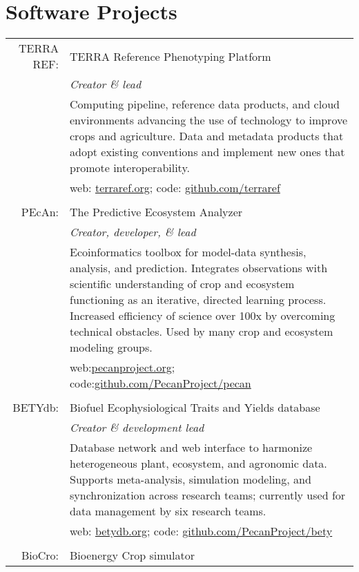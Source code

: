 \documentclass[a4paper,10pt]{article}
\begin{document}
\section{Software Projects}

\begin{tabular}{rp{11cm}}
TERRA REF:&TERRA Reference Phenotyping Platform\\
& \small \textit{Creator \& lead}\\
& \small Computing pipeline, reference data products, and cloud environments advancing the use of technology to improve crops and agriculture. Data and metadata products that adopt existing conventions and implement new ones that promote interoperability.\\
& \small web: \href{http://www.terraref.org}{terraref.org}; code:  \href{https://github.com/terraref}{github.com/terraref}\\
\multicolumn{2}{c}{} \\
PEcAn:&The Predictive Ecosystem Analyzer\\
& \small \textit{Creator, developer, \& lead}\\
& \small Ecoinformatics toolbox for model-data synthesis, analysis, and prediction. Integrates observations with scientific understanding of crop and ecosystem functioning as an iterative, directed learning process. Increased efficiency of science over 100x by overcoming technical obstacles. Used by many crop and ecosystem modeling groups.\\
& \small web:\href{http://www.pecanproject.org}{pecanproject.org};  code:\href{https://github.com/PecanProject/pecan}{github.com/PecanProject/pecan}\\
\multicolumn{2}{c}{} \\
BETYdb:&Biofuel Ecophysiological Traits and Yields database\\
& \small \textit{Creator \& development lead}\\
& \small{Database network and web interface to harmonize heterogeneous plant, ecosystem, and agronomic data. Supports meta-analysis, simulation modeling, and synchronization across research teams; currently used for data management by six research teams.}\\
& \small web: \href{http://www.betydb.org}{betydb.org}; code:  \href{https://github.com/PecanProject/bety}{github.com/PecanProject/bety}\\
\multicolumn{2}{c}{} \\
BioCro:&Bioenergy Crop simulator\\

\end{tabular}
\end{document}

